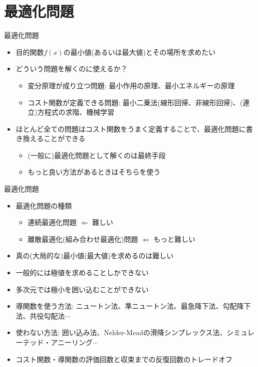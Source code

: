 \section{最適化問題}

\begin{frame}[t,fragile]{最適化問題}
  \begin{itemize}
    \setlength{\itemsep}{1em}
  \item 目的関数$f(x)$の最小値(あるいは最大値)とその場所を求めたい
  \item どういう問題を解くのに使えるか？
    \begin{itemize}
    \item 変分原理が成り立つ問題: 最小作用の原理、最小エネルギーの原理
    \item コスト関数が定義できる問題: 最小二乗法(線形回帰、非線形回帰)、(連立)方程式の求階、機械学習
    \end{itemize}
  \item ほとんど全ての問題はコスト関数をうまく定義することで、最適化問題に書き換えることができる
    \begin{itemize}
    \item (一般に)最適化問題として解くのは最終手段
    \item もっと良い方法があるときはそちらを使う
    \end{itemize}
  \end{itemize}
\end{frame}

\begin{frame}[t,fragile]{最適化問題}
  \begin{itemize}
  \item 最適化問題の種類
    \begin{itemize}
    \item 連続最適化問題 $\Leftarrow$ 難しい
    \item 離散最適化(組み合わせ最適化)問題 $\Leftarrow$ もっと難しい
    \end{itemize}
  \item 真の(大局的な)最小値(最大値)を求めるのは難しい
  \item 一般的には極値を求めることしかできない
  \item 多次元では極小を囲い込むことができない
  \item 導関数を使う方法: ニュートン法、準ニュートン法、最急降下法、勾配降下法、共役勾配法$\cdots$
  \item 使わない方法: 囲い込み法、Nelder-Meadの滑降シンプレックス法、シミュレーテッド・アニーリング$\cdots$
  \item コスト関数・導関数の評価回数と収束までの反復回数のトレードオフ
  \end{itemize}
\end{frame}
